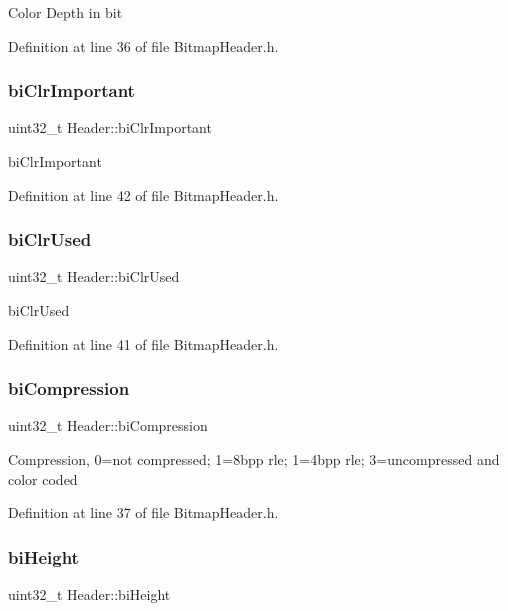 Color Depth in bit 

Definition at line 36 of file Bitmap\+Header.\+h.

\mbox{\label{structHeader_a935b0e4f146a944af7243154f99cbc99}} 
\subsubsection{\texorpdfstring{biClrImportant}{biClrImportant}}
{\footnotesize\ttfamily uint32\+\_\+t Header\+::bi\+Clr\+Important}

bi\+Clr\+Important 

Definition at line 42 of file Bitmap\+Header.\+h.

\mbox{\label{structHeader_a1d847ba2e7caf89429c1fffdc54be1ea}} 
\subsubsection{\texorpdfstring{biClrUsed}{biClrUsed}}
{\footnotesize\ttfamily uint32\+\_\+t Header\+::bi\+Clr\+Used}

bi\+Clr\+Used 

Definition at line 41 of file Bitmap\+Header.\+h.

\mbox{\label{structHeader_a18f90bd3b3aac03aadb4bfe9072795bd}} 
\subsubsection{\texorpdfstring{biCompression}{biCompression}}
{\footnotesize\ttfamily uint32\+\_\+t Header\+::bi\+Compression}

Compression, 0=not compressed; 1=8bpp rle; 1=4bpp rle; 3=uncompressed and color coded 

Definition at line 37 of file Bitmap\+Header.\+h.

\mbox{\label{structHeader_a3b4e976dbf78cd5a03e37b6a42577dcd}} 
\subsubsection{\texorpdfstring{biHeight}{biHeight}}
{\footnotesize\ttfamily uint32\+\_\+t Header\+::bi\+Height}

